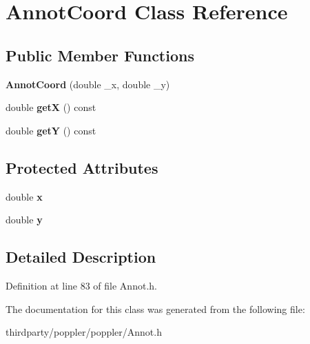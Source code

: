 \hypertarget{class_annot_coord}{}\section{Annot\+Coord Class Reference}
\label{class_annot_coord}
\subsection*{Public Member Functions}
\begin{DoxyCompactItemize}
\item 
\mbox{\label{class_annot_coord_a2e3acedd9c5610564f6931f4e08fa425}} 
{\bfseries Annot\+Coord} (double \+\_\+x, double \+\_\+y)
\item 
\mbox{\label{class_annot_coord_a8c2339ec34608d925a4d4a77e5d73eff}} 
double {\bfseries getX} () const
\item 
\mbox{\label{class_annot_coord_a295f4102bd0cc56bbfa1f881ca480de5}} 
double {\bfseries getY} () const
\end{DoxyCompactItemize}
\subsection*{Protected Attributes}
\begin{DoxyCompactItemize}
\item 
\mbox{\label{class_annot_coord_a3e2cda63187724fa161b26c791a57965}} 
double {\bfseries x}
\item 
\mbox{\label{class_annot_coord_a0baac8ce0fd109aa5cf029dc2ab6cd2e}} 
double {\bfseries y}
\end{DoxyCompactItemize}


\subsection{Detailed Description}


Definition at line 83 of file Annot.\+h.



The documentation for this class was generated from the following file\+:\begin{DoxyCompactItemize}
\item 
thirdparty/poppler/poppler/Annot.\+h\end{DoxyCompactItemize}

